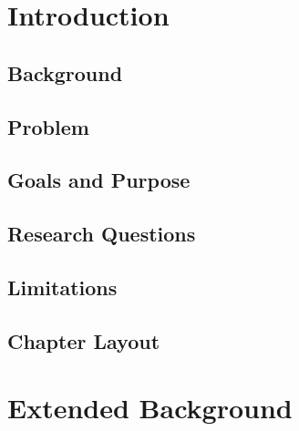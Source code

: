\documentclass[12pt,
               a4,
               twoside,
               openright]{book} %
\begin{document}
  
    \frontmatterDSV %
    
    \tableofcontents
    
    
    
    \chapter{Introduction}
    \label{chap:introduction}
    
    \section{Background}
    \label{sec:background}
    

    \section{Problem}
    \label{sec:problem}    
    
    
    \section{Goals and Purpose}
    \label{sec:resq}
    
        
    \section{Research Questions}
    \label{sec:resq}
    
    
    \section{Limitations}
    \label{sec:resq}
    
    
    \section{Chapter Layout}
    \label{sec:resq}
    
    
    
    \chapter{Extended Background}
    \label{chap:extendedBackgrounf}
    
\end{document}
